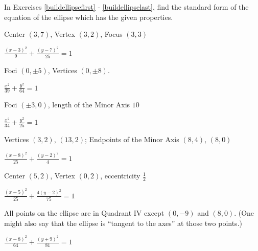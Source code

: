 \documentclass{ximera}
\begin{document}
\begin{question}
    In Exercises \ref{buildellipsefirst} - \ref{buildellipselast},  find the standard form of the equation of the ellipse which has the given properties.


\begin{problem}\label{buildellipsefirst}
    Center $(3, 7)$, Vertex $(3, 2)$, Focus $(3, 3)$ 

\begin{solution}
    $\frac{(x - 3)^{2}}{9} + \frac{(y - 7)^{2}}{25} = 1$
\end{solution}
\end{problem}

\begin{problem}
    Foci $(0, \pm 5)$, Vertices $(0, \pm 8)$.

\begin{solution}
    $\frac{x^{2}}{39} + \frac{y^{2}}{64} = 1$
\end{solution}
\end{problem}

\begin{problem}
     Foci $(\pm 3, 0)$, length of the Minor Axis $10$

\begin{solution}
    $\frac{x^{2}}{34} + \frac{y^{2}}{25} = 1$
\end{solution}
\end{problem}

\begin{problem}
    Vertices $(3,2)$, $(13,2)$; Endpoints of the Minor Axis $(8,4)$, $(8,0)$

\begin{solution}
     $\frac{(x - 8)^{2}}{25} + \frac{(y - 2)^{2}}{4} = 1$
\end{solution}
\end{problem}

\begin{problem}
    Center $(5,2)$, Vertex $(0,2)$, eccentricity $\frac{1}{2}$

\begin{solution}
    $\frac{(x-5)^{2}}{25} + \frac{4(y-2)^{2}}{75} = 1$
\end{solution}
\end{problem}

\begin{problem}\label{buildellipselast}
    All points on the ellipse are in Quadrant IV except $(0, -9)$ and $(8, 0)$.  (One might also say that the ellipse is ``tangent to the axes'' at those two points.)  

\begin{solution}
    $\frac{(x - 8)^{2}}{64} + \frac{(y + 9)^{2}}{81} = 1$
\end{solution}
\end{problem}

\end{question}
\end{document}
